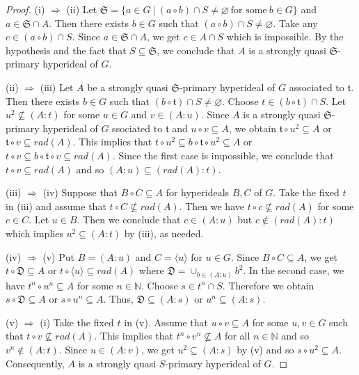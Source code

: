 \documentclass[preprint,review,10pt]{amsart}
\theoremstyle{definition}
\theoremstyle{remark}
\numberwithin{equation}{section}
\begin{document}
 \begin{proof}
 (i) $\Longrightarrow$ (ii) Let $\mathfrak{S}=\{a \in G \ \vert \ (a \circ b) \cap S \neq  \varnothing  \ \text{for some} \ b \in G\}$ and $a \in \mathfrak{S} \cap A$. Then there exists $b \in G$ such that $(a \circ b) \cap S \neq \varnothing$. Take any $c \in (a \circ b) \cap S$. Since $a \in \mathfrak{S} \cap A$, we get  $c \in A \cap S$ which is impossible. By the hypothesis and the fact that $S \subseteq \mathfrak{S}$, we conclude that $A$ is a strongly quasi $\mathfrak{S}$-primary  hyperideal of $G$.
 
  (ii) $\Longrightarrow$ (iii) Let $A$ be a strongly quasi $\mathfrak{S}$-primary  hyperideal of $G$ associated to $\mathfrak{t}$. Then there exists $b \in G$ such that $(b \circ \mathfrak{t} ) \cap S \neq \varnothing$. Choose $t \in (b \circ \mathfrak{t} ) \cap S$. Let $u^2 \nsubseteq (A : t)$ for some $u \in G$ and $ v \in (A : u)$. Since  $A$ is  a strongly quasi $\mathfrak{S}$-primary  hyperideal of $G$ ssociated to $\mathfrak{t}$ and $u \circ v \subseteq A$, we obtain $\mathfrak{t} \circ u^2 \subseteq A$ or $\mathfrak{t} \circ v \subseteq rad(A)$. This implies that $t \circ u^2 \subseteq b \circ \mathfrak{t}  \circ u^2 \subseteq A$ or $t \circ v \subseteq b \circ \mathfrak{t} \circ v \subseteq rad(A)$. Since the first case is impossible, we conclude that $t \circ v \subseteq rad(A)$ and so $(A : u) \subseteq (rad(A) : t)$.
 
   (iii) $\Longrightarrow$ (iv) Suppose that $B \circ C \subseteq A$ for hyperideals $B, C$ of $G$. Take the fixed $t$ in (iii) and assume that $t \circ C \nsubseteq rad(A)$. Then we have $t \circ c \nsubseteq rad(A)$ for some $c \in C$. Let $u \in B$. Then we conclude that $c \in (A : u)$ but $c \notin(rad(A) : t)$ which implies $u^2 \subseteq (A:t)$ by (iii), as needed. 
  
   (iv) $\Longrightarrow$ (v) Put $B=(A: u)$ and $C=\langle u \rangle$ for $u \in G$. Since $B \circ C  \subseteq  A$, we get $t \circ \mathfrak{D} \subseteq A$ or $t  \circ \langle u \rangle \subseteq rad(A)$ where $\mathfrak{D}=\cup_{b \in (A:u)} b^2 $. In the second case, we have $t^n \circ u^n \subseteq A$ for some $n \in \mathbb{N}$. Choose $s \in t^n \cap S$. Therefore we obtain $s \circ \mathfrak{D}  \subseteq A$ or $s \circ u^n \subseteq  A$. Thus, $\mathfrak{D}  \subseteq (A:s)$ or $u^n \subseteq (A:s)$.
  
    (v) $\Longrightarrow$ (i) Take the fixed $t$ in (v). Assume that $u \circ v \subseteq A$ for some $u,v \in G$ such that $t \circ v \nsubseteq rad(A)$.  This implies that $t^n \circ v^n \nsubseteq A$ for all $n \in \mathbb{N}$ and so $v^n \notin (A : t)$. Since $u \in (A: v)$, we get $u^2 \subseteq (A:s)$ by (v) and so $s \circ u^2 \subseteq  A$. Consequently,   $A$ is a strongly quasi $S$-primary  hyperideal of $G$.
 \end{proof}
\end{document}
